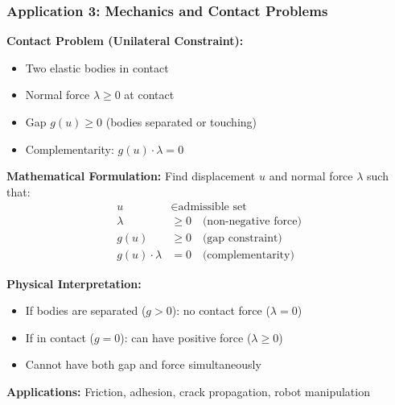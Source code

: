 \documentclass[aspectratio=169,10pt]{beamer}
\begin{document}
\begin{frame}
\frametitle{Application 3: Mechanics and Contact Problems}

\textbf{Contact Problem (Unilateral Constraint):}
\begin{itemize}
    \item Two elastic bodies in contact
    \item Normal force $\lambda \geq 0$ at contact
    \item Gap $g(u) \geq 0$ (bodies separated or touching)
    \item Complementarity: $g(u) \cdot \lambda = 0$
\end{itemize}

\vspace{0.3cm}

\textbf{Mathematical Formulation:}
Find displacement $u$ and normal force $\lambda$ such that:
\begin{align*}
u &\in \text{admissible set}\\
\lambda &\geq 0 \quad \text{(non-negative force)}\\
g(u) &\geq 0 \quad \text{(gap constraint)}\\
g(u) \cdot \lambda &= 0 \quad \text{(complementarity)}
\end{align*}

\vspace{0.3cm}

\textbf{Physical Interpretation:}
\begin{itemize}
    \item If bodies are separated ($g > 0$): no contact force ($\lambda = 0$)
    \item If in contact ($g = 0$): can have positive force ($\lambda \geq 0$)
    \item Cannot have both gap and force simultaneously
\end{itemize}

\vspace{0.3cm}

\textbf{Applications:} Friction, adhesion, crack propagation, robot manipulation

\end{frame}
\end{document}
